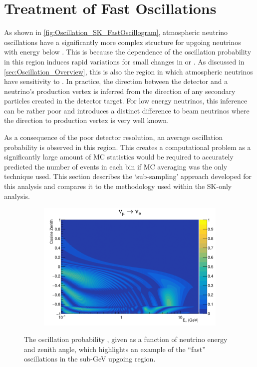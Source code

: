 \section{Treatment of Fast Oscillations}
\label{sec:Oscillation_FastOscillations}

As shown in \autoref{fig:Oscillation_SK_FastOscillogram}, atmospheric neutrino oscillations have a significantly more complex structure for upgoing neutrinos with energy below . This is because the  dependence of the oscillation probability in this region induces rapid variations for small changes in  or . As discussed in \autoref{sec:Oscillation_Overview}, this is also the region in which atmospheric neutrinos have sensitivity to \dcp. In practice, the direction between the detector and a neutrino's production vertex is inferred from the direction of any secondary particles created in the detector target. For low energy neutrinos, this inference can be rather poor and introduces a distinct difference to beam neutrinos where the direction to production vertex is very well known.

As a consequence of the poor detector resolution, an average oscillation probability is observed in this region. This creates a computational problem as a significantly large amount of MC statistics would be required to accurately predicted the number of events in each bin if MC averaging was the only technique used. This section describes the `sub-sampling' approach developed for this analysis and compares it to the methodology used within the SK-only analysis.

\begin{figure}[h]
  \begin{subfigure}[t]{0.8\textwidth}
    \includegraphics[width=\textwidth, trim={0mm 0mm 0mm 0mm}, clip,page=1]{Figures/Oscillation/FastOscillationExample.pdf}
  \end{subfigure}
  \caption{The oscillation probability , given as a function of neutrino energy and zenith angle, which highlights an example of the ``fast'' oscillations in the sub-GeV upgoing region.}
  \label{fig:Oscillation_SK_FastOscillogram}
\end{figure}

